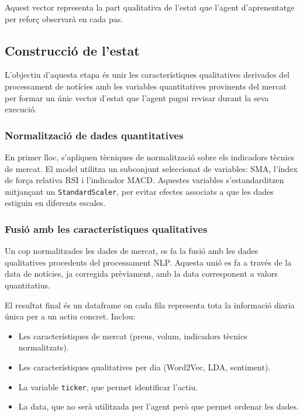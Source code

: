 \documentclass[12pt,a4paper,twoside]{book}
\begin{document}
Aquest vector representa la part qualitativa de l'estat que l'agent d'aprenentatge per reforç observarà en cada pas.

\subsection{Construcció de l'estat}

L'objectiu d'aquesta etapa és unir les característiques qualitatives derivades del processament de notícies amb les variables quantitatives provinents del mercat per formar un únic vector d'estat que l'agent pugui revisar durant la seva execució.

\subsubsection{Normalització de dades quantitatives}
En primer lloc, s'apliquen tècniques de normalització sobre els indicadors tècnics de mercat. El model utilitza un subconjunt seleccionat de variables: SMA, l'índex de força relativa RSI i l'indicador MACD. Aquestes variables s'estandarditzen mitjançant un \texttt{StandardScaler}, per evitar efectes associats a que les dades estiguin en diferents escales.

\subsubsection{Fusió amb les característiques qualitatives}

Un cop normalitzades les dades de mercat, es fa la fusió amb les dades qualitatives procedents del processament NLP. Aquesta unió es fa a través de la data de notícies, ja corregida prèviament, amb la data corresponent a valors quantitatius.


El resultat final és un dataframe on cada fila representa tota la informació diaria única per a un actiu concret. Inclou:
\begin{itemize}
    \item Les característiques de mercat (preus, volum, indicadors tècnics normalitzats).
    \item Les característiques qualitatives per dia (Word2Vec, LDA, sentiment).
    \item La variable \texttt{ticker}, que permet identificar l'actiu.
    \item La data, que no serà utilitzada per l'agent però que permet ordenar les dades.
\end{itemize}
\end{document}
